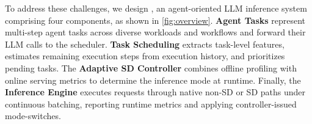 To address these challenges, we design \sysname, an agent-oriented LLM inference system comprising four components, as shown in \autoref{fig:overview}. 
\textbf{Agent Tasks} represent multi-step agent tasks across diverse workloads and workflows and forward their LLM calls to the scheduler.
\textbf{Task Scheduling} extracts task-level features, estimates remaining execution steps from execution history, and prioritizes pending tasks.
The \textbf{Adaptive SD Controller} combines offline profiling with online serving metrics to determine the inference mode at runtime.
Finally, the \textbf{Inference Engine} executes requests through native non-SD or SD paths under continuous batching, reporting runtime metrics and applying controller-issued mode-switches.

